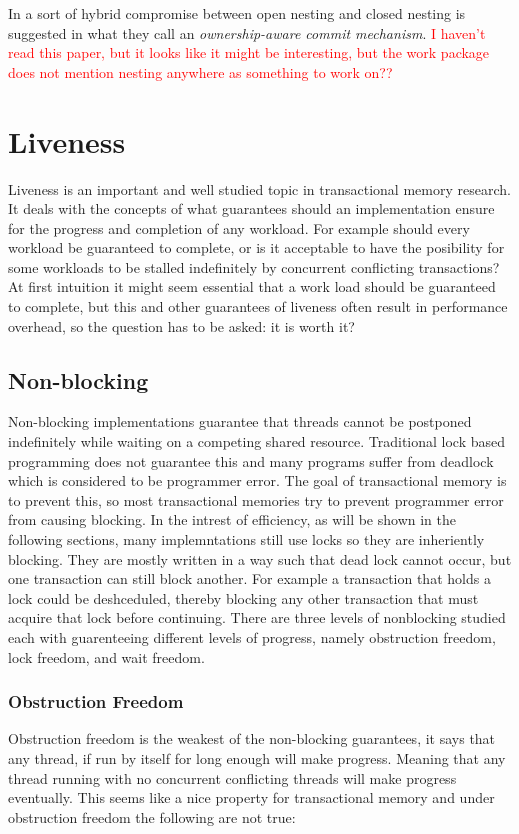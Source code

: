 In \cite{1378553} a sort of hybrid compromise between open nesting and closed nesting is suggested in what they call an \emph{ownership-aware commit mechanism}.
\textcolor{Red}{I haven't read this paper, but it looks like it might be interesting, but the work package does not mention nesting anywhere as something to work on??}

\section{Liveness}
Liveness is an important and well studied topic in transactional memory research.
It deals with the concepts of what guarantees should an implementation ensure for the progress and completion of any workload.
For example should every workload be guaranteed to complete, or is it acceptable to have the posibility for some workloads to be stalled indefinitely by concurrent conflicting transactions?
At first intuition it might seem essential that a work load should be guaranteed to complete, but this and other guarantees of liveness often result in performance overhead, so the question has to be asked: it is worth it?

\subsection{Non-blocking}
Non-blocking implementations guarantee that threads cannot be postponed indefinitely while waiting on a competing shared resource.
Traditional lock based programming does not guarantee this and many programs suffer from deadlock which is considered to be programmer error.
The goal of transactional memory is to prevent this, so most transactional memories try to prevent programmer error from causing blocking.
In the intrest of efficiency, as will be shown in the following sections, many implemntations still use locks so they are inheriently blocking.
They are mostly written in a way such that dead lock cannot occur, but one transaction can still block another.
For example a transaction that holds a lock could be deshceduled, thereby blocking any other transaction that must acquire that lock before continuing.
There are three levels of nonblocking studied each with guarenteeing different levels of progress, namely obstruction freedom, lock freedom, and wait freedom.



\subsubsection{Obstruction Freedom}
Obstruction freedom is the weakest of the non-blocking guarantees, it says that any thread, if run by itself for long enough will make progress.
Meaning that any thread running with no concurrent conflicting threads will make progress eventually.
This seems like a nice property for transactional memory and under obstruction freedom the following are not true:

